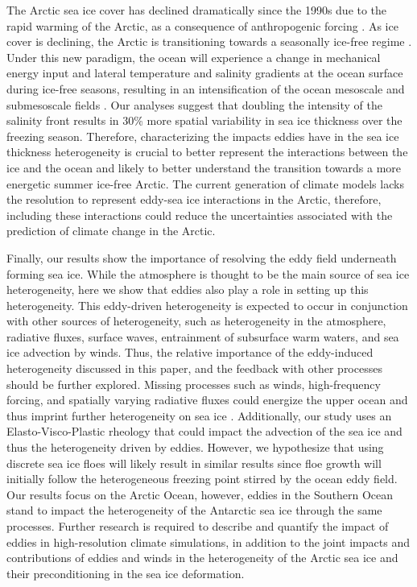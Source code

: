 \documentclass[draft]{agujournal2019}
\begin{document}
The Arctic sea ice cover has declined dramatically since the 1990s due to the rapid warming of the Arctic, as a consequence of anthropogenic forcing \citep{IPCC_arctic_2022}. As ice cover is declining, the Arctic is transitioning towards a seasonally ice-free regime \citep{Crawford_open_water_2021}. Under this new paradigm, the ocean will experience a change in mechanical energy input and lateral temperature and salinity gradients at the ocean surface during ice-free seasons, resulting in an intensification of the ocean mesoscale and submesoscale fields \citep{Li_intensification_2024, Martin_trend_2014,McPhee_intensification_2013}. Our analyses suggest that doubling the intensity of the salinity front results in 30\% more spatial variability in sea ice thickness over the freezing season. Therefore, characterizing the impacts eddies have in the sea ice thickness heterogeneity is crucial to better represent the interactions between the ice and the ocean and likely to better understand the transition towards a more energetic summer ice-free Arctic. The current generation of climate models lacks the resolution to represent eddy-sea ice interactions in the Arctic, therefore, including these interactions could reduce the uncertainties associated with the prediction of climate change in the Arctic. 
 
Finally, our results show the importance of resolving the eddy field underneath forming sea ice. While the atmosphere is thought to be the main source of sea ice heterogeneity, here we show that eddies also play a role in setting up this heterogeneity. This eddy-driven heterogeneity is expected to occur in conjunction with other sources of heterogeneity, such as heterogeneity in the atmosphere, radiative fluxes, surface waves, entrainment of subsurface warm waters, and sea ice advection by winds. Thus, the relative importance of the eddy-induced heterogeneity discussed in this paper, and the feedback with other processes should be further explored. Missing processes such as winds, high-frequency forcing, and spatially varying radiative fluxes could energize the upper ocean and thus imprint further heterogeneity on sea ice \citep{Gupta_melt_2022}. Additionally, our study uses an Elasto-Visco-Plastic rheology that could impact the advection of the sea ice and thus the heterogeneity driven by eddies. However, we hypothesize that using discrete sea ice floes will likely result in similar results since floe growth will initially follow the heterogeneous freezing point stirred by the ocean eddy field. Our results focus on the Arctic Ocean, however, eddies in the Southern Ocean stand to impact the heterogeneity of the Antarctic sea ice through the same processes. Further research is required to describe and quantify the impact of eddies in high-resolution climate simulations, in addition to the joint impacts and contributions of eddies and winds in the heterogeneity of the Arctic sea ice and their preconditioning in the sea ice deformation.
\end{document}
